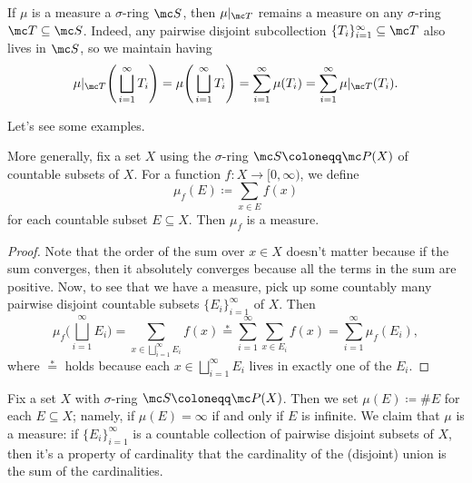 \documentclass[../notes.tex]{subfiles}
\begin{document}
\begin{remark} \label{rem:restrict-measure}
	If $\mu$ is a measure a $\sigma$-ring $\mc S$, then $\mu|_{\mc T}$ remains a measure on any $\sigma$-ring $\mc T\subseteq\mc S$. Indeed, any pairwise disjoint subcollection $\{T_i\}_{i=1}^\infty\subseteq\mc T$ also lives in $\mc S$, so we maintain having
	\[\mu|_{\mc T}\Bigg(\bigsqcup_{i=1}^\infty T_i\Bigg)=\mu\Bigg(\bigsqcup_{i=1}^\infty T_i\Bigg)=\sum_{i=1}^\infty\mu(T_i)=\sum_{i=1}^\infty\mu|_{\mc T}(T_i).\]
\end{remark}
Let's see some examples.
\begin{exe} \label{exe:discrete-integral}
	More generally, fix a set $X$ using the $\sigma$-ring $\mc S\coloneqq\mc P(X)$ of countable subsets of $X$. For a function $f\colon X\to[0,\infty)$, we define
	\[\mu_f(E)\coloneqq\sum_{x\in E}f(x)\]
	for each countable subset $E\subseteq X$. Then $\mu_f$ is a measure.
\end{exe}
\begin{proof}
	Note that the order of the sum over $x\in X$ doesn't matter because if the sum converges, then it absolutely converges because all the terms in the sum are positive. Now, to see that we have a measure, pick up some countably many pairwise disjoint countable subsets $\{E_i\}_{i=1}^\infty$ of $X$. Then
	\[\mu_f\Bigg(\bigsqcup_{i=1}^\infty E_i\Bigg)=\sum_{x\in\bigsqcup_{i=1}^\infty E_i}f(x)\stackrel*=\sum_{i=1}^\infty\sum_{x\in E_i}f(x)=\sum_{i=1}^\infty\mu_f(E_i),\]
	where $\stackrel*=$ holds because each $x\in\bigsqcup_{i=1}^\infty E_i$ lives in exactly one of the $E_i$.
\end{proof}
\begin{ex}
	Fix a set $X$ with $\sigma$-ring $\mc S\coloneqq\mc P(X)$. Then we set $\mu(E)\coloneqq\#E$ for each $E\subseteq X$; namely, if $\mu(E)=\infty$ if and only if $E$ is infinite. We claim that $\mu$ is a measure: if $\{E_i\}_{i=1}^\infty$ is a countable collection of pairwise disjoint subsets of $X$, then it's a property of cardinality that the cardinality of the (disjoint) union is the sum of the cardinalities.
\end{ex}
\end{document}
